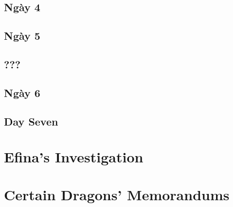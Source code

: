 \documentclass[13pt]{extarticle}
\begin{document}
	\subsection*{Ngày 4}
	
	
	\subsection*{Ngày 5}
	
	
	\subsection*{???}
	

	\subsection*{Ngày 6}
	

	\subsection*{Day Seven}

	
	\section{Efina’s Investigation}
	
	\section{Certain Dragons’ Memorandums}
	
	
\end{document}
